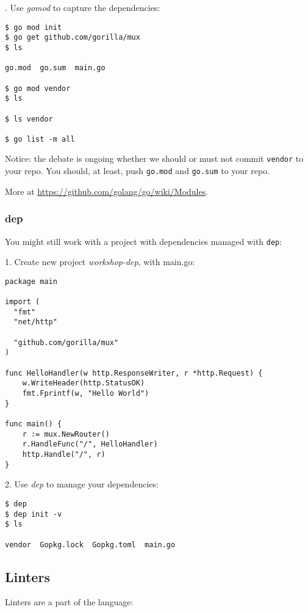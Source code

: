 \documentclass[11pt, letterpaper]{article}
\begin{document}
. Use \emph{gomod} to capture the dependencies:

\begin{verbatim}
$ go mod init
$ go get github.com/gorilla/mux
$ ls

go.mod  go.sum  main.go

$ go mod vendor
$ ls

$ ls vendor

$ go list -m all
\end{verbatim}

Notice: the debate is ongoing whether we should or must not commit \verb|vendor| to your repo. You should, at least, push \verb|go.mod| and \verb|go.sum| to your repo.

More at \href{https://github.com/golang/go/wiki/Modules}{https://github.com/golang/go/wiki/Modules}.

\subsubsection{dep}

You might still work with a project with dependencies managed with \verb|dep|:

1. Create new project \emph{workshop-dep}, with main.go:

\begin{verbatim}
package main

import (
  "fmt"
  "net/http"

  "github.com/gorilla/mux"
)

func HelloHandler(w http.ResponseWriter, r *http.Request) {
    w.WriteHeader(http.StatusOK)
    fmt.Fprintf(w, "Hello World")
}

func main() {
    r := mux.NewRouter()
    r.HandleFunc("/", HelloHandler)
    http.Handle("/", r)
}
\end{verbatim}

\bigskip

2. Use \emph{dep} to manage your dependencies:

\begin{verbatim}
$ dep
$ dep init -v
$ ls

vendor  Gopkg.lock  Gopkg.toml  main.go
\end{verbatim}

\subsection{Linters}

Linters are a part of the language:
\end{document}
